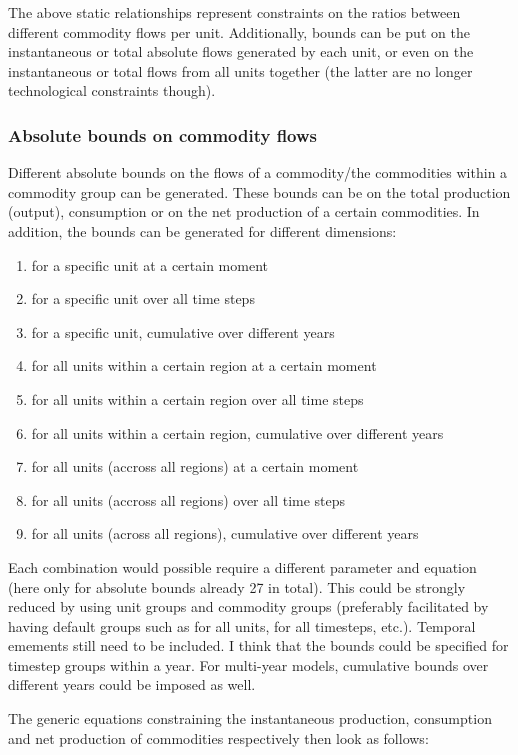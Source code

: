 The above static relationships represent constraints on the ratios between different commodity flows per unit. Additionally, bounds can be put on the instantaneous or total absolute flows generated by each unit, or even on the instantaneous or total flows from all units together (the latter are no longer technological constraints though).

\subsubsection{Absolute bounds on commodity flows}

Different absolute bounds on the flows of a commodity/the commodities within a commodity group can be generated. These bounds can be on the total production (output), consumption or on the net production of a certain commodities. In addition, the bounds can be generated for different dimensions:
\begin{enumerate}
	\item for a specific unit at a certain moment
	\item for a specific unit over all time steps
	\item for a specific unit, cumulative over different years
	\item for all units within a certain region at a certain moment
	\item for all units within a certain region over all time steps
	\item for all units within a certain region, cumulative over different years
	\item for all units (accross all regions) at a certain moment
	\item for all units (accross all regions) over all time steps
	\item for all units (across all regions), cumulative over different years
\end{enumerate}
Each combination would possible require a different parameter and equation (here only for absolute bounds already 27 in total). This could be strongly reduced by using unit groups and commodity groups (preferably facilitated by having default groups such as for all units, for all timesteps, etc.). {\color{red} Temporal emements still need to be included. I think that the bounds could be specified for timestep groups within a year. For multi-year models, cumulative bounds over different years could be imposed as well.}


 The generic equations constraining the instantaneous production, consumption and net production of commodities respectively then look as follows: 

